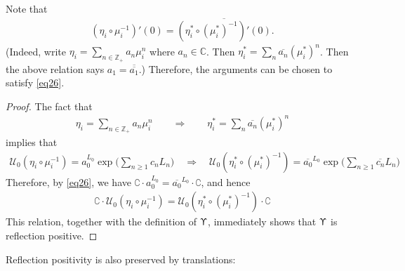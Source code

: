 \documentclass[11pt,b5paper,notitlepage]{article}
\theoremstyle{definition}
\theoremstyle{plain}
\newcommand{\mc}{\mathcal}
\newcommand{\ovl}{\overline}
\newcommand{\Co}{\complement}
\newcommand{\Cbb}{\mathbb C}
\newcommand{\Zbb}{\mathbb Z}
\numberwithin{equation}{section}
\begin{document}
Note that
\begin{align}
(\eta_i\circ\mu_i^{-1})'(0)=\ovl{(\eta_i^*\circ(\mu_i^*)^{-1})'(0)}. \label{eq46}
\end{align}
(Indeed, write $\eta_i=\sum_{n\in\Zbb_+} a_n\mu_i^n$ where $a_n\in\Cbb$. Then $\eta_i^*=\sum_n \ovl{a_n}(\mu_i^*)^n$. Then the above relation says $a_1=\ovl{\ovl{a_1}}$.) Therefore, the arguments can be chosen to satisfy \eqref{eq26}.



\begin{proof}
The fact that
\begin{align*}
\eta_i=\sum_{n\in\Zbb_+} a_n\mu_i^n\qquad\Longrightarrow \qquad\eta_i^*=\sum_n \ovl{a_n}(\mu_i^*)^n
\end{align*}
implies that
\begin{align*}
\mc U_0(\eta_i\circ\mu_i^{-1})=a_0^{L_0}\exp\Big(\sum_{n\geq 1 }c_nL_n\Big)\quad\Rightarrow \quad \mc U_0(\eta_i^*\circ(\mu_i^*)^{-1})=\ovl{ a_0}^{L_0}\exp\Big(\sum_{n\geq 1 }\ovl{c_n}L_n\Big)
\end{align*}
Therefore, by \eqref{eq26}, we have $\Co\cdot a_0^{L_0}=\ovl{a_0}^{L_0}\cdot \Co$, and hence
\begin{align}\label{eq47}
\Co\cdot  \mc U_0(\eta_i\circ\mu_i^{-1})=\mc U_0(\eta_i^*\circ(\mu_i^*)^{-1})\cdot\Co
\end{align}
This relation, together with the definition of $\Upupsilon$, immediately shows that $\Upupsilon$ is reflection positive.
\end{proof}


Reflection positivity is also preserved by translations:
\end{document}
